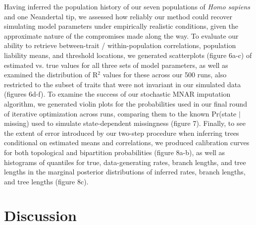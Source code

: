 \documentclass[12pt, twocolumn, twoside]{article}
\begin{document}
Having inferred the population history of our seven populations of \textit{Homo sapiens} and one Neandertal tip, we assessed how reliably our method could recover simulating model parameters under empirically realistic conditions, given the approximate nature of the compromises made along the way. To evaluate our ability to retrieve between-trait / within-population correlations, population liability means, and threshold locations, we generated scatterplots (figure 6a-c) of estimated vs. true values for all three sets of model parameters, as well as examined the distribution of R$^2$ values for these across our 500 runs, also restricted to the subset of traits that were not invariant in our simulated data (figures 6d-f). To examine the success of our stochastic MNAR imputation algorithm, we generated violin plots for the probabilities used in our final round of iterative optimization across runs, comparing them to the known Pr(state $\vert$ missing) used to simulate state-dependent missingness (figure 7). Finally, to see the extent of error introduced by our two-step procedure when inferring trees conditional on estimated means and correlations, we produced calibration curves for both topological and bipartition probabilities (figure 8a-b), as well as histograms of quantiles for true, data-generating rates, branch lengths, and tree lengths in the marginal posterior distributions of inferred rates, branch lengths, and tree lengths (figure 8c).

\clearpage

\section*{Discussion}
\end{document}
